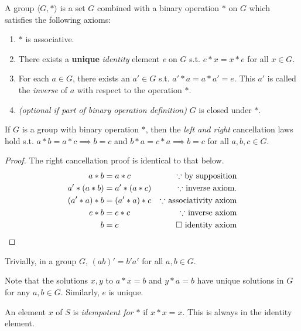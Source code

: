 \begin{definition}[Group]
    A group $\langle G, * \rangle$ is a set $G$ combined with a binary operation $*$ on $G$ which satisfies the following axioms:
    \begin{enumerate}[label = ($\mathscr{G}_{\arabic*}$)]
        \item $*$ is associative.
        \item There exists a \textbf{unique} \emph{identity} element \textit{e} on $G$ s.t. $e*x = x*e$ for all $x \in G$. 
        \item For each $a \in G$, there exists an $a' \in G$ s.t. $a'*a = a*a'=e$. This $a'$ is called the \textit{inverse} of $a$ with respect to the operation $*$.
        \item \textit{(optional if part of binary operation definition)} $G$ is closed under $*$.
    \end{enumerate}
\end{definition}
\begin{theorem}
    If $G$ is a group with binary operation $*$, then the \emph{left and right} cancellation laws hold s.t. $a*b=a*c \implies b=c$ and $b*a=c*a \implies b=c$ for all $a,b,c \in G$.
\end{theorem}
\begin{proof}
    The right cancellation proof is identical to that below.
    \begin{align*}
        a*b &= a*c & \text{$\because$ by supposition}\\
        a'*(a*b) &= a'*(a*c) & \text{$\because$ inverse axiom}.\\
        (a'*a)*b &= (a'*a)*c & \text{$\because$ associativity axiom} \\
        e*b &= e*c & \text{$\because$ inverse axiom} \\
        b &= c & \text{$\qed$ identity axiom}
    \end{align*}
\end{proof}
\begin{theorem}
    Trivially, in a group $G$, $(ab)' = b'a'$ for all $a,b \in G$.
\end{theorem}
\begin{remark}
    Note that the solutions $x,y$ to $a*x=b$ and $y*a=b$ have unique solutions in $G$ for any $a,b \in G$. Similarly, $e$ is unique.
\end{remark}
\begin{note}
    An element $x$ of $S$ is \emph{idempotent for $*$} if $x*x=x$. This is always in the identity element.
\end{note}
